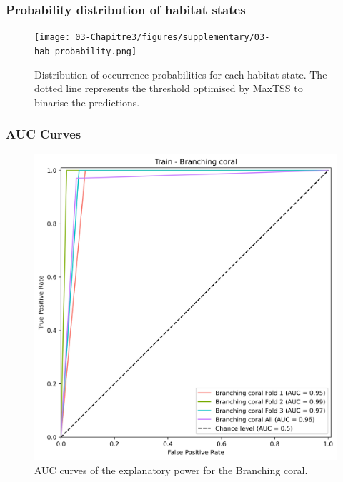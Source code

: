 \hypertarget{probability-distribution-of-habitat-states}{%
\subsubsection*{Probability distribution of habitat
states}\label{probability-distribution-of-habitat-states}}

\begin{figure}
\hypertarget{fig:chap3figS7}{%
\centering
\texttt{[image: 03-Chapitre3/figures/supplementary/03-hab\_probability.png]}
\caption{Distribution of occurrence probabilities for each habitat
state. The dotted line represents the threshold optimised by MaxTSS to
binarise the predictions.}\label{fig:chap3figS7}
}
\end{figure}

\hypertarget{auc-curves}{%
\subsubsection*{AUC Curves}\label{auc-curves}}

\begin{figure}
\hypertarget{fig:chap3figS8}{%
\centering
\includegraphics{03-Chapitre3/figures/supplementary/03-receiver_operator_curve_train_rf_Branching coral.png}
\caption{AUC curves of the explanatory power for the Branching
coral.}\label{fig:chap3figS8}
}
\end{figure}

